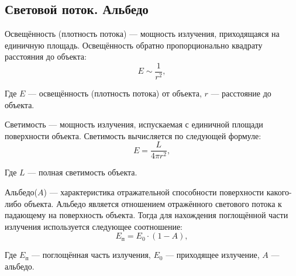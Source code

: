 \subsection{Световой поток. Альбедо}
Освещённость (плотность потока) --- мощность излучения, приходящаяся на единичную площадь. Освещённость обратно пропорционально квадрату расстояния до объекта:
\begin{equation}
E\sim \frac{1}{r^2},
\end{equation}

Где $E$ --- освещённость (плотность потока) от объекта, $r$ --- расстояние до объекта.

Светимость --- мощность излучения, испускаемая с единичной площади поверхности объекта. Светимость вычисляется по следующей формуле:
\begin{equation}
E=\frac{L}{4\pi r^2},
\end{equation}

Где $L$ --- полная светимость объекта.

Альбедо($A$) --- характеристика отражательной способности поверхности какого-либо объекта. Альбедо является отношением отражённого светового потока к падающему на поверхность объекта. Тогда для нахождения поглощённой части излучения используется следующее соотношение:
\begin{equation}
E_{\text{п}}=E_0\cdot (1-A),
\end{equation}

Где $E_{\text{п}}$ --- поглощённая часть излучения, $E_0$ --- приходящее излучение, $A$ --- альбедо.